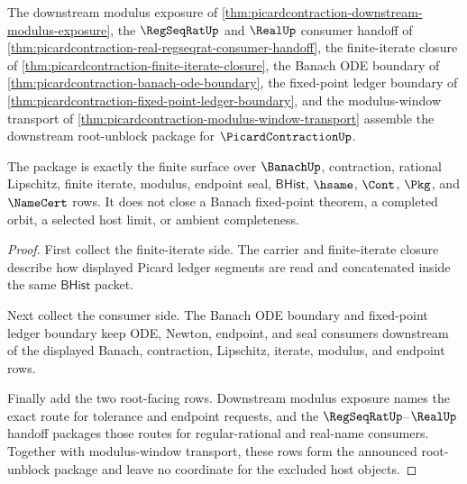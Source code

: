 \begin{theorem}
\label{thm:picardcontraction-root-unblock-package}
The downstream modulus exposure of \autoref{thm:picardcontraction-downstream-modulus-exposure}, the $\RegSeqRatUp$ and $\RealUp$ consumer handoff of \autoref{thm:picardcontraction-real-regseqrat-consumer-handoff}, the finite-iterate closure of \autoref{thm:picardcontraction-finite-iterate-closure}, the Banach ODE boundary of \autoref{thm:picardcontraction-banach-ode-boundary}, the fixed-point ledger boundary of \autoref{thm:picardcontraction-fixed-point-ledger-boundary}, and the modulus-window transport of \autoref{thm:picardcontraction-modulus-window-transport} assemble the downstream root-unblock package for $\PicardContractionUp$.

The package is exactly the finite surface over $\BanachUp$, contraction, rational Lipschitz, finite iterate, modulus, endpoint seal, $\mathsf{BHist}$, $\hsame$, $\Cont$, $\Pkg$, and $\NameCert$ rows. It does not close a Banach fixed-point theorem, a completed orbit, a selected host limit, or ambient completeness.
\end{theorem}
\begin{proof}
First collect the finite-iterate side. The carrier and finite-iterate closure describe how displayed Picard ledger segments are read and concatenated inside the same $\mathsf{BHist}$ packet.

Next collect the consumer side. The Banach ODE boundary and fixed-point ledger boundary keep ODE, Newton, endpoint, and seal consumers downstream of the displayed Banach, contraction, Lipschitz, iterate, modulus, and endpoint rows.

Finally add the two root-facing rows. Downstream modulus exposure names the exact route for tolerance and endpoint requests, and the $\RegSeqRatUp$--$\RealUp$ handoff packages those routes for regular-rational and real-name consumers. Together with modulus-window transport, these rows form the announced root-unblock package and leave no coordinate for the excluded host objects.
\end{proof}

